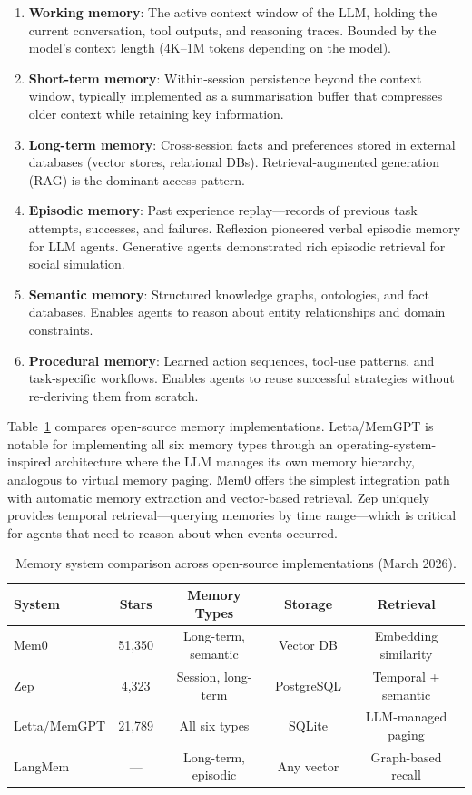 \documentclass[review,authoryear]{elsarticle}
\theoremstyle{definition}
\begin{document}
\begin{enumerate}
    \item \textbf{Working memory}: The active context window of the LLM, holding the current conversation, tool outputs, and reasoning traces. Bounded by the model's context length (4K--1M tokens depending on the model).
    \item \textbf{Short-term memory}: Within-session persistence beyond the context window, typically implemented as a summarisation buffer that compresses older context while retaining key information.
    \item \textbf{Long-term memory}: Cross-session facts and preferences stored in external databases (vector stores, relational DBs). Retrieval-augmented generation (RAG) \citep{lewis2020retrieval} is the dominant access pattern.
    \item \textbf{Episodic memory}: Past experience replay---records of previous task attempts, successes, and failures. Reflexion \citep{shinn2023reflexion} pioneered verbal episodic memory for LLM agents. Generative agents \citep{park2023generative} demonstrated rich episodic retrieval for social simulation.
    \item \textbf{Semantic memory}: Structured knowledge graphs, ontologies, and fact databases. Enables agents to reason about entity relationships and domain constraints.
    \item \textbf{Procedural memory}: Learned action sequences, tool-use patterns, and task-specific workflows. Enables agents to reuse successful strategies without re-deriving them from scratch.
\end{enumerate}

Table~\ref{tab:memory} compares open-source memory implementations. Letta/MemGPT \citep{packer2023memgpt} is notable for implementing all six memory types through an operating-system-inspired architecture where the LLM manages its own memory hierarchy, analogous to virtual memory paging. Mem0 \citep{mem0_2024} offers the simplest integration path with automatic memory extraction and vector-based retrieval. Zep \citep{zep2024} uniquely provides temporal retrieval---querying memories by time range---which is critical for agents that need to reason about when events occurred.

\begin{table}[ht]
\centering
\caption{Memory system comparison across open-source implementations (March 2026).}
\label{tab:memory}
\begin{tabular}{lcccc}
\toprule
\textbf{System} & \textbf{Stars} & \textbf{Memory Types} & \textbf{Storage} & \textbf{Retrieval} \\
\midrule
Mem0         & 51,350 & Long-term, semantic  & Vector DB  & Embedding similarity \\
Zep          & 4,323  & Session, long-term   & PostgreSQL & Temporal + semantic \\
Letta/MemGPT & 21,789 & All six types        & SQLite     & LLM-managed paging \\
LangMem      & ---    & Long-term, episodic  & Any vector & Graph-based recall \\
\bottomrule
\end{tabular}
\end{table}
\end{document}
